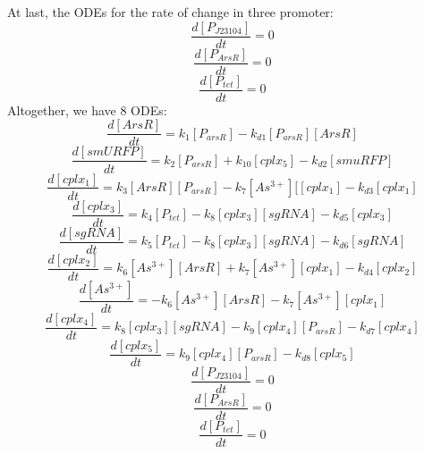 At last, the ODEs for the rate of change in three promoter:
\begin{equation}
\frac{d[P_{J23104}]}{dt}=0\tag{10}
\end{equation} 
\begin{equation}
\frac{d[P_{ArsR}]}{dt}=0\tag{11}
\end{equation} 
\begin{equation}
\frac{d[P_{tet}]}{dt}=0\tag{12}
\end{equation} 
Altogether, we have 8 ODEs:
\begin{equation}
\frac{d[ArsR]}{dt}=k_1[P_{arsR}]-k_{d1}[P_{arsR}][ArsR]\tag{1}
\end{equation}
\begin{equation}
\frac{d[smURFP]}{dt}=k_2[P_{arsR}]+k_{10}[cplx_5]-k_{d2}[smuRFP]\tag{2}
\end{equation}
\begin{equation}
\frac{d[cplx_1]}{dt}=k_3[ArsR][P_{arsR}]-k_7[As^{3+}][[cplx_1]-k_{d3}[cplx_1] \tag{3}
\end{equation}
\begin{equation}
\frac{d[cplx_3]}{dt}=k_4[P_{tet}]-k_{8}[cplx_3][sgRNA]-k_{d5}[cplx_3] \tag{4}
\end{equation}
\begin{equation}
\frac{d[sgRNA]}{dt}=k_5[P_{tet}]-k_{8}[cplx_3][sgRNA]-k_{d6}[sgRNA] \tag{5}
\end{equation}
\begin{equation}
\frac{d[cplx_2]}{dt}=k_{6}[As^{3+}][ArsR]+k_7[As^{3+}][cplx_1]-k_{d4}[cplx_2] \tag{6}
\end{equation}
\begin{equation}
\frac{d[As^{3+}]}{dt}=-k_{6}[As^{3+}][ArsR]-k_7[As^{3+}][cplx_1] \tag{7}
\end{equation}
\begin{equation}
\frac{d[cplx_4]}{dt}=k_{8}[cplx_3][sgRNA]-k_{9}[cplx_4][P_{arsR}]-k_{d7}[cplx_4]\tag{8}
\end{equation}
\begin{equation}
\frac{d[cplx_5]}{dt}=k_{9}[cplx_4][P_{arsR}]-k_{d8}[cplx_5]\tag{9}
\end{equation} 
\begin{equation}
\frac{d[P_{J23104}]}{dt}=0\tag{10}
\end{equation} 
\begin{equation}
\frac{d[P_{ArsR}]}{dt}=0\tag{11}
\end{equation} 
\begin{equation}
\frac{d[P_{tet}]}{dt}=0\tag{12}
\end{equation} 
